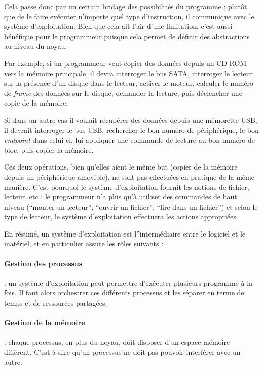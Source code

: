 Cela passe donc par un certain bridage des possibilités du programme : plutôt
que de le faire exécuter n'importe quel type d'instruction, il communique avec
le système d'exploitation. Bien que cela ait l'air d'une limitation, c'est aussi
bénéfique pour le programmeur puisque cela permet de définir des abstractions au
niveau du noyau.

Par exemple, si un programmeur veut copier des données depuis un CD-ROM vers la
mémoire principale, il devra interroger le bus SATA, interroger le lecteur sur
la présence d'un disque dans le lecteur, activer le moteur, calculer le numéro
de \emph{frame} des données sur le disque, demander la lecture, puis déclencher
une copie de la mémoire.

Si dans un autre cas il voulait récupérer des données depuis une mémorette USB,
il devrait interroger le bus USB, rechercher le bon numéro de périphérique, le
bon \emph{endpoint} dans celui-ci, lui appliquer une commande de lecture au bon
numéro de bloc, puis copier la mémoire.

Ces deux opérations, bien qu'elles aient le même but (copier de la mémoire
depuis un périphérique amovible), ne sont pas effectuées en pratique de la même
manière. C'est pourquoi le système d'exploitation fournit les notions de
fichier, lecteur, etc : le programmeur n'a plus qu'à utiliser des commandes de
haut niveau (``monter un lecteur'', ``ouvrir un fichier'', ``lire dans un
fichier'') et selon le type de lecteur, le système d'exploitation effectuera les
actions appropriées.

En résumé, un système d'exploitation est l''intermédiaire entre le logiciel et
le matériel, et en particulier assure les rôles suivants :

\paragraph{Gestion des processus} : un système d'exploitation peut permettre
d'exécuter plusieurs programme à la fois. Il faut alors orchestrer ces
différents processus et les séparer en terme de temps et de ressources
partagées.

\paragraph{Gestion de la mémoire} : chaque processus, en plus du noyau, doit
disposer d'un espace mémoire différent. C'est-à-dire qu'un processus ne doit pas
pouvoir interférer avec un autre.

